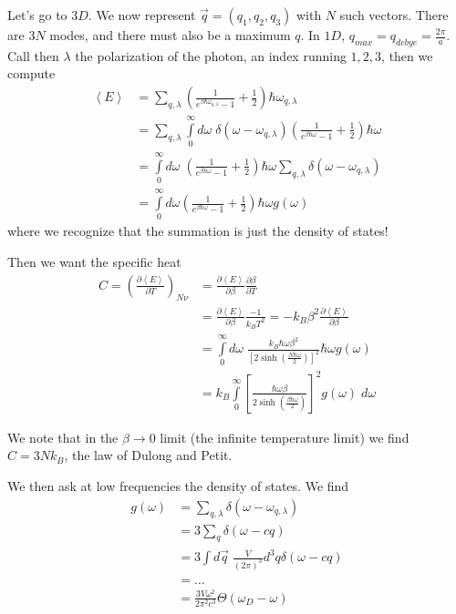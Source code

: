 \documentclass[10pt]{report}
\newcommand{\pd}[2]{\frac{\partial #1}{\partial#2}}
\newcommand{\expvalue}[1]{\left<#1\right>}
\begin{document}
Let's go to $3D$. We now represent $\vec{q} = \left( q_1, q_2, q_3 \right)$ with $N$ such vectors. There are $3N$ modes, and there must also be a maximum $q$. In $1D$, $q_{max} = q_{debye} = \frac{2\pi}{a}$. Call then $\lambda$ the polarization of the photon, an index running $1,2,3$, then we compute
\begin{align}
    \expvalue{E} &= \sum\limits_{q,\lambda}^{}\left( \frac{1}{e^{\beta \hbar \omega_{q,\lambda}} - 1} + \frac{1}{2} \right) \hbar \omega_{q,\lambda}\\
    &= \sum\limits_{q,\lambda}^{} \int\limits_{0}^{\infty}d\omega\; \delta(\omega - \omega_{q,\lambda})\left( \frac{1}{e^{\beta \hbar \omega} - 1} + \frac{1}{2} \right)\hbar \omega\\
    &= \int\limits_{0}^{\infty}d\omega\;\left( \frac{1}{e^{\beta \hbar \omega} - 1} + \frac{1}{2} \right)\hbar \omega \sum\limits_{q,\lambda}^{}\delta\left( \omega - \omega_{q,\lambda} \right)\\
    &= \int\limits_{0}^{\infty}d\omega\left( \frac{1}{e^{\beta \hbar \omega} - 1} + \frac{1}{2} \right)\hbar \omega g(\omega)
\end{align}
where we recognize that the summation is just the density of states! 

Then we want the specific heat
\begin{align}
    C = \left( \pd{\expvalue{E}}{T} \right)_{N \nu} &= \pd{\expvalue{E}}{\beta}\pd{\beta}{T}\\
    &= \pd{\expvalue{E}}{\beta}\frac{-1}{k_BT^2} = -k_B \beta^2 \pd{\expvalue{E}}{\beta}\\
    &= \int\limits_{0}^{\infty}d\omega\;\frac{k_B \hbar \omega \beta^2}{\left[ 2\sinh\left( \frac{N\hbar \omega}{2} \right) \right]^2}\hbar \omega g(\omega)\\
    &= k_B \int\limits_{0}^{\infty}\left[ \frac{\hbar \omega \beta}{2 \sinh\left( \frac{\beta \hbar \omega}{2} \right)} \right]^2g(\omega)\;d\omega
\end{align}

We note that in the $\beta \to 0$ limit (the infinite temperature limit) we find $C = 3Nk_B$, the law of Dulong and Petit.

We then ask at low frequencies the density of states. We find
\begin{align}
    g(\omega) &= \sum\limits_{q,\lambda}^{} \delta\left( \omega - \omega_{q,\lambda} \right)\\
    &= 3\sum\limits_{q}^{}\delta\left( \omega - cq \right)\\
    &= 3\int\limits_{}^{}d\vec{q}\;\frac{V}{(2\pi)^3}d^3q\delta\left( \omega - cq \right)\\
    &=\dots\\
    &= \frac{3V\omega^2}{2\pi^2c^3}\Theta(\omega_D - \omega)
\end{align}
\end{document}
